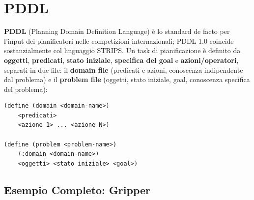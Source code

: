 \documentclass[a4paper,11pt]{article}
\begin{document}
\newpage
\section{PDDL}

\textbf{PDDL} (Planning Domain Definition Language) è lo standard de facto per l'input dei pianificatori nelle competizioni internazionali; PDDL 1.0 coincide sostanzialmente col linguaggio STRIPS. Un task di pianificazione è definito da \textbf{oggetti}, \textbf{predicati}, \textbf{stato iniziale}, \textbf{specifica del goal} e \textbf{azioni/operatori}, separati in due file: il \textbf{domain file} (predicati e azioni, conoscenza indipendente dal problema) e il \textbf{problem file} (oggetti, stato iniziale, goal, conoscenza specifica del problema):
\begin{lstlisting}
(define (domain <domain-name>)
    <predicati>
    <azione 1> ... <azione N>)

(define (problem <problem-name>)
    (:domain <domain-name>)
    <oggetti> <stato iniziale> <goal>)
\end{lstlisting}

\subsection{Esempio Completo: Gripper}
\end{document}
